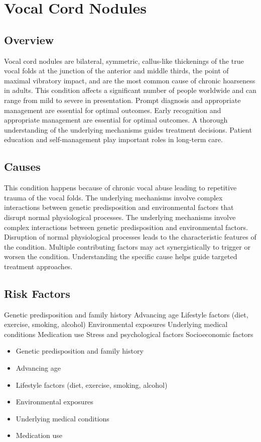 \chapter{Vocal Cord Nodules}
\label{sec:Vocal Cord Nodules}

\section{Overview}
Vocal cord nodules are bilateral, symmetric, callus-like thickenings of the true vocal folds at the junction of the anterior and middle thirds, the point of maximal vibratory impact, and are the most common cause of chronic hoarseness in adults. This condition affects a significant number of people worldwide and can range from mild to severe in presentation. Prompt diagnosis and appropriate management are essential for optimal outcomes. Early recognition and appropriate management are essential for optimal outcomes. A thorough understanding of the underlying mechanisms guides treatment decisions. Patient education and self-management play important roles in long-term care.
\section{Causes}
This condition happens because of chronic vocal abuse leading to repetitive trauma of the vocal folds. The underlying mechanisms involve complex interactions between genetic predisposition and environmental factors that disrupt normal physiological processes. The underlying mechanisms involve complex interactions between genetic predisposition and environmental factors. Disruption of normal physiological processes leads to the characteristic features of the condition. Multiple contributing factors may act synergistically to trigger or worsen the condition. Understanding the specific cause helps guide targeted treatment approaches.
\section{Risk Factors}
Genetic predisposition and family history Advancing age Lifestyle factors (diet, exercise, smoking, alcohol) Environmental exposures Underlying medical conditions Medication use Stress and psychological factors Socioeconomic factors

\begin{itemize}[noitemsep]
  \item Genetic predisposition and family history
  \item Advancing age
  \item Lifestyle factors (diet, exercise, smoking, alcohol)
  \item Environmental exposures
  \item Underlying medical conditions
  \item Medication use
\end{itemize}
